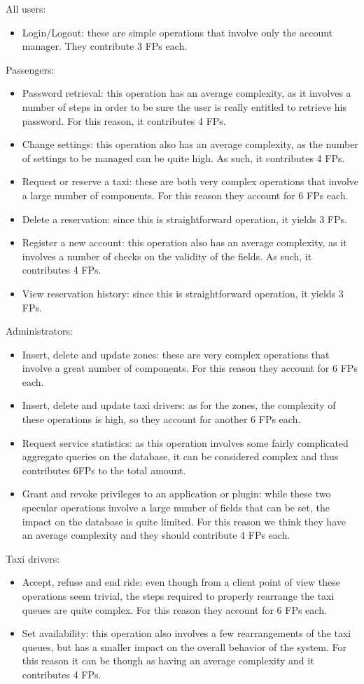 All users:
\begin{itemize}
	\item Login/Logout: these are simple operations that involve only the account manager. They contribute 3 FPs each.
\end{itemize}
Passengers:
\begin{itemize}
	\item Password retrieval: this operation has an average complexity, as it involves a number of steps in order to be sure the user is really entitled to retrieve his password. For this reason, it contributes 4 FPs.
	\item Change settings: this operation also has an average complexity, as the number of settings to be managed can be quite high. As such, it contributes 4 FPs.
	\item Request or reserve a taxi: these are both very complex operations that involve a large number of components. For this reason they account for 6 FPs each.
	\item Delete a reservation: since this is straightforward operation, it yields 3 FPs. 
	\item Register a new account: this operation also has an average complexity, as it involves a number of checks on the validity of the fields. As such, it contributes 4 FPs.
	\item View reservation history: since this is straightforward operation, it yields 3 FPs. 
\end{itemize}
Administrators:
\begin{itemize}
	\item Insert, delete and update zones: these are very complex operations that involve a great number of components. For this reason they account for 6 FPs each.
	\item Insert, delete and update taxi drivers: as for the zones, the complexity of these operations is high, so they account for another 6 FPs each. 
	\item Request service statistics: as this operation involves some fairly complicated aggregate queries on the database, it can be considered complex and thus contributes 6FPs to the total amount.
	\item Grant and revoke privileges to an application or plugin: while these two specular operations involve a large number of fields that can be set, the impact on the database is quite limited. For this reason we think they have an average complexity and they should contribute 4 FPs each.
\end{itemize}
Taxi drivers:
\begin{itemize}
	\item Accept, refuse and end ride: even though from a client point of view these operations seem trivial, the steps required to properly rearrange the taxi queues are quite complex. For this reason they account for 6 FPs each.
	\item Set availability: this operation also involves a few rearrangements of the taxi queues, but has a smaller impact on the overall behavior of the system. For this reason it can be though as having an average complexity and it contributes 4 FPs.
\end{itemize}

